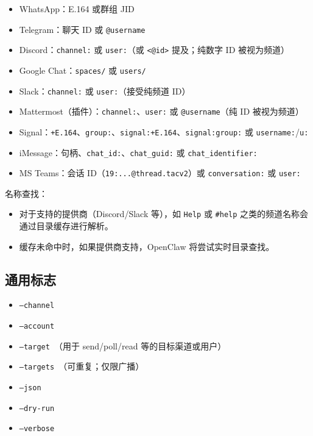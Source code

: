 \begin{itemize}
  \item WhatsApp：E.164 或群组 JID
  \item Telegram：聊天 ID 或 \texttt{@username}
  \item Discord：\texttt{channel:} 或 \texttt{user:}（或 \texttt{<@id>} 提及；纯数字 ID 被视为频道）
  \item Google Chat：\texttt{spaces/} 或 \texttt{users/}
  \item Slack：\texttt{channel:} 或 \texttt{user:}（接受纯频道 ID）
  \item Mattermost（插件）：\texttt{channel:}、\texttt{user:} 或 \texttt{@username}（纯 ID 被视为频道）
  \item Signal：\texttt{+E.164}、\texttt{group:}、\texttt{signal:+E.164}、\texttt{signal:group:} 或 \texttt{username:}/\texttt{u:}
  \item iMessage：句柄、\texttt{chat\_id:}、\texttt{chat\_guid:} 或 \texttt{chat\_identifier:}
  \item MS Teams：会话 ID（\texttt{19:...@thread.tacv2}）或 \texttt{conversation:} 或 \texttt{user:}
\end{itemize}


名称查找：

\begin{itemize}
  \item 对于支持的提供商（Discord/Slack 等），如 \texttt{Help} 或 \texttt{\#help} 之类的频道名称会通过目录缓存进行解析。
  \item 缓存未命中时，如果提供商支持，OpenClaw 将尝试实时目录查找。
\end{itemize}


\subsection{通用标志}


\begin{itemize}
  \item \texttt{--channel }
  \item \texttt{--account }
  \item \texttt{--target }（用于 send/poll/read 等的目标渠道或用户）
  \item \texttt{--targets }（可重复；仅限广播）
  \item \texttt{--json}
  \item \texttt{--dry-run}
  \item \texttt{--verbose}
\end{itemize}


